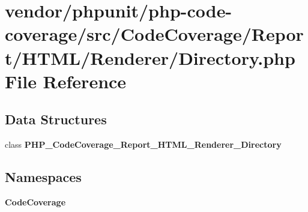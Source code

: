\section{vendor/phpunit/php-\/code-\/coverage/src/\+Code\+Coverage/\+Report/\+H\+T\+M\+L/\+Renderer/\+Directory.php File Reference}
\label{phpunit_2php-code-coverage_2src_2_code_coverage_2_report_2_h_t_m_l_2_renderer_2_directory_8php}
\subsection*{Data Structures}
\begin{DoxyCompactItemize}
\item 
class {\bf P\+H\+P\+\_\+\+Code\+Coverage\+\_\+\+Report\+\_\+\+H\+T\+M\+L\+\_\+\+Renderer\+\_\+\+Directory}
\end{DoxyCompactItemize}
\subsection*{Namespaces}
\begin{DoxyCompactItemize}
\item 
 {\bf Code\+Coverage}
\end{DoxyCompactItemize}
